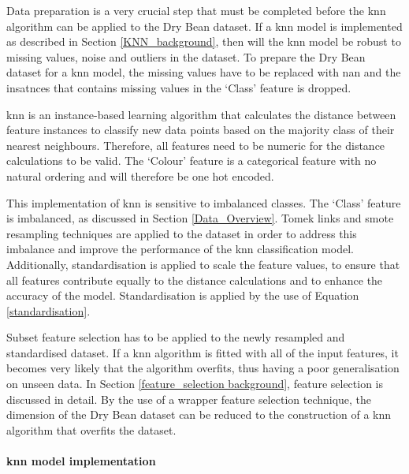 \documentclass[10pt, conference]{IEEEtran}
\begin{document}
Data preparation is a very crucial step that must be completed before the \acrshort{knn} algorithm can be applied to the Dry
Bean dataset. If a \acrshort{knn} model is implemented as described in Section \ref{KNN_background}, then
will the \acrshort{knn} model be robust to missing values, noise and outliers in the dataset. To prepare
the Dry Bean dataset for a \acrshort{knn} model, the missing values have to be replaced with \acrshort{nan}
and the insatnces that contains missing values in the `Class' feature is dropped.

\acrshort{knn} is an instance-based learning algorithm that calculates the distance between feature
instances to classify new data points based on the majority class of their nearest neighbours. Therefore, all features need
to be numeric for the distance calculations to be valid. The `Colour' feature is a categorical feature with no
natural ordering and will therefore be one hot encoded.

This implementation of \acrshort{knn} is sensitive to imbalanced classes. The `Class' feature is imbalanced, as
discussed in Section \ref{Data_Overview}. Tomek links and \acrshort{smote} resampling techniques are applied to the
dataset in order to address this imbalance and improve the performance of the \acrshort{knn} classification model.
Additionally, standardisation is applied to scale the feature values, to ensure that all features contribute
equally to the distance calculations and to enhance the accuracy of the model. Standardisation is applied
by the use of Equation \eqref{standardisation}.

Subset feature selection has to be applied to the newly resampled and standardised dataset. If a \acrshort{knn} algorithm
is fitted with all of the input features, it becomes very likely that the algorithm overfits, thus having a poor
generalisation on unseen data. In Section \ref{feature_selection background}, feature selection is discussed in detail.
By the use of a wrapper feature selection technique, the dimension of the Dry Bean dataset can be reduced to the
construction of a \acrshort{knn} algorithm that overfits the dataset.

\paragraph{\acrshort{knn} model implementation}
\end{document}
